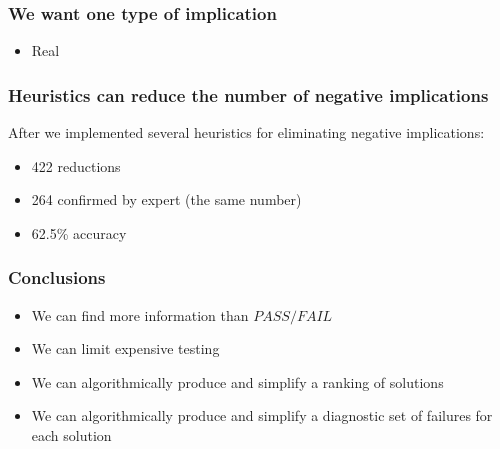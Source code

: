 \documentclass[svgnames]{beamer}
\newcommand\fail{\mathit{FAIL}}
\newcommand\pass{\mathit{PASS}}
\theoremstyle{definition}
\begin{document}
\begin{frame}
\frametitle{We want one type of implication}
\begin{itemize}
\item Real
\end{itemize}
\end{frame}

\begin{frame}
\frametitle{Heuristics can reduce the number of negative implications}
After we implemented several heuristics for eliminating negative implications:
\begin{itemize}
\item 422 reductions
\item 264 confirmed by expert (the same number)
\item 62.5\% accuracy
\end{itemize}
\end{frame}

\begin{frame}
\frametitle{Conclusions}
\begin{itemize}
\item We can find more information than $\pass/\fail$
\item We can limit expensive testing
\item We can algorithmically produce and simplify a ranking of solutions
\item We can algorithmically produce and simplify a diagnostic set of failures for each solution
\end{itemize}
\end{frame}
\end{document}
